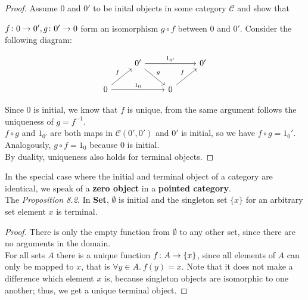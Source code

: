 \begin{proof}
Assume $0$ and $0'$ to be inital objects in some category $\mathscr{C}$ and show that

$f \from 0 \to 0', g \from 0' \to 0$ form an isomorphism
$g \circ f$ between $0$ and $0'$. Consider the following diagram:

\[
\begin{tikzcd}
  & 0' \arrow{dr}{g} \arrow{rr}{1_{0'}}    &&  0'\\
  0 \arrow{ur}{f} \arrow{rr}{1_0} && 0 \arrow{ur}{f}
\end{tikzcd}
\]


Since $0$ is initial, we know that $f$ is unique, from the same argument follows the uniqueness of $g = f^{-1}$. \\$f \circ g$ and $1_{0'}$ are both maps in $\mathscr{C}(0', 0')$ and $0'$ is initial, so we have $f \circ g = 1_0'$. Analogously, $g \circ f = 1_0$ because $0$ is initial. \\
By duality, uniqueness also holds for terminal objects. 
\end{proof}
In the special case where the initial and terminal object of a category are identical, we speak of a \textbf{zero object} in a \textbf{pointed category}.\\
The 
\textit{Proposition 8.2.} In \textbf{Set}, $\emptyset$ is initial and the singleton set $\{x\}$ for an arbitrary set element $x$ is terminal.
\begin{proof}
There is only the empty function from $\emptyset$ to any other set, since there are no arguments in the domain.
\\For all sets $A$ there is a unique function $f \from A \to \{x\}$, since all elements of $A$ can only be mapped
  to $x$, that is $\forall y \in A.\ f(y) = x$. Note that it does not make a difference which element $x$ is, because singleton objects are isomorphic to one another; thus, we get a unique terminal object.
\end{proof}
